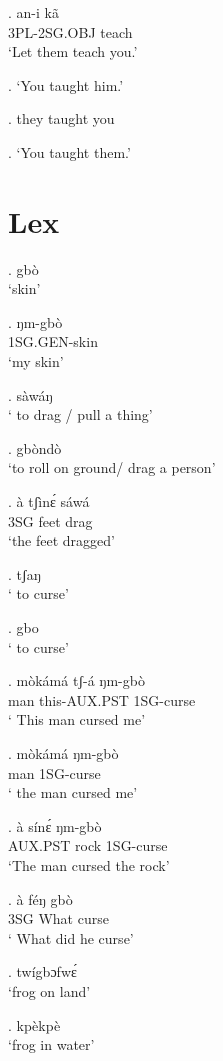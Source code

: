 \documentclass{assets/fieldnotes}
\begin{document}

\exg. an-i kã \\
3PL-2SG.OBJ teach \\
`Let them teach you.'

\ex. `You taught him.'

\ex. they taught you

\ex. `You taught them.'


\section{Lex}

\ex. gbò\\
`skin'

\ex. ŋm-gbò \\
1SG.GEN-skin\\
`my skin'

\ex. sàwáŋ\\
` to drag / pull a thing'

\ex. gbòndò\\
`to roll on ground/ drag a person'

\exg. à tʃìnɛ́ sáwá \\ 
 3SG feet drag \\
`the feet dragged'

\ex. tʃaŋ\\
` to curse'

\ex. gbo\\
` to curse'

\exg. mòkámá tʃ-á ŋm-gbò \\
 man  this-AUX.PST 1SG-curse\\
` This man cursed me'

\exg. mòkámá  ŋm-gbò \\
man  1SG-curse \\
` the man cursed me'

\exg. à sínɛ́ ŋm-gbò \\
AUX.PST rock 1SG-curse\\
`The man cursed the rock'

\exg. à féŋ gbò\\
3SG What curse\\
` What did he curse'


\ex. twígbɔfwɛ́\\
`frog on land'

\ex. kpèkpè\\
`frog in water'
\end{document}
